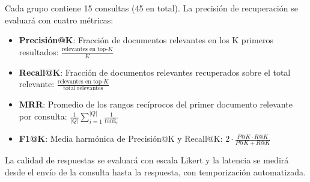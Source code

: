 \documentclass[11pt, a4paper]{article}
\begin{document}
Cada grupo contiene 15 consultas (45 en total). La precisión de recuperación se evaluará con cuatro métricas:

\begin{itemize}
    \item \textbf{Precisión@K}: Fracción de documentos relevantes en los K primeros resultados: $\frac{\text{relevantes en top-}K}{K}$
    \item \textbf{Recall@K}: Fracción de documentos relevantes recuperados sobre el total relevante: $\frac{\text{relevantes en top-}K}{\text{total relevantes}}$
    \item \textbf{MRR}: Promedio de los rangos recíprocos del primer documento relevante por consulta: $\frac{1}{|Q|} \sum_{i=1}^{|Q|} \frac{1}{\text{rank}_i}$
    \item \textbf{F1@K}: Media harmónica de Precisión@K y Recall@K: $2 \cdot \frac{P@K \cdot R@K}{P@K + R@K}$
\end{itemize}

La calidad de respuestas se evaluará con escala Likert y la latencia se medirá desde el envío de la consulta hasta la respuesta, con temporización automatizada.

\printbibliography[title={Referencias}]
\end{document}
